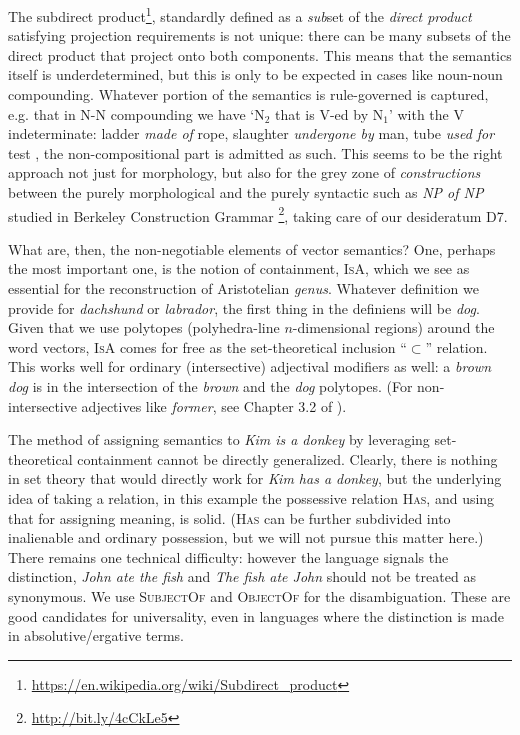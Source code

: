 \documentclass[output=paper]{langscibook}
\begin{document}
The subdirect product\footnote{\url{https://en.wikipedia.org/wiki/Subdirect_product}},
standardly defined as a \textit{sub}set of the \textit{direct product} satisfying
projection requirements is not unique: there can be many subsets of the direct
product that project onto both components. This means that the semantics
itself is underdetermined, but this is only to be expected in cases like
noun-noun compounding. Whatever portion of the semantics is rule-governed is
captured, e.g. that in N-N compounding we have `N$_2$ that is V-ed by N$_1$'
with the V indeterminate: ladder \textit{made of} rope, slaughter \textit{undergone
  by} man, tube \textit{used for} test \citep{Kiparsky:1982b}, the
non-compositional part is admitted as such. This seems to be the right approach
not just for morphology, but also for the grey zone of \textit{constructions}
between the purely morphological and the purely syntactic such as \textit{NP of
  NP} studied in Berkeley Construction Grammar \citep{Kornai:1988a}\footnote{\url{http://bit.ly/4cCkLe5} }, taking care of our desideratum
D7.

What are, then, the non-negotiable elements of vector
semantics? One, perhaps the most important one, is the notion of containment,
\textsc{IsA}, which we see as essential for the reconstruction of Aristotelian
\textit{genus}. Whatever definition we provide for \textit{dachshund} or \textit{labrador}, the first thing in the definiens will be \textit{dog}. Given that we
use polytopes (polyhedra-line $n$-dimensional regions) around the word
vectors, \textsc{IsA} comes for free as the set-theoretical inclusion “$\subset$”
relation. This works well for ordinary (intersective) adjectival modifiers
as well: a \textit{brown dog} is in the intersection of the \textit{brown} and the
\textit{dog} polytopes. (For non-intersective adjectives like \textit{former}, see
Chapter 3.2 of \cite{Kornai:2022}).

The method of assigning semantics to \textit{Kim is a donkey} by leveraging
set-theo\-ret\-ical containment cannot be directly generalized.  Clearly,
there is nothing in set theory that would directly work for \textit{Kim has a
  donkey}, but the underlying idea of taking a relation, in this example the
possessive relation \textsc{Has}, and using that for assigning meaning, is
solid. (\textsc{Has} can be further subdivided into inalienable and ordinary
possession, but we will not pursue this matter here.) There remains one
technical difficulty: however the language signals the distinction, \textit{John
  ate the fish} and \textit{The fish ate John} should not be treated as
synonymous. We use \textsc{SubjectOf} and \textsc{ObjectOf} for the
disambiguation. These are good candidates for universality, even in languages
where the distinction is made in absolutive/ergative terms.
\end{document}
